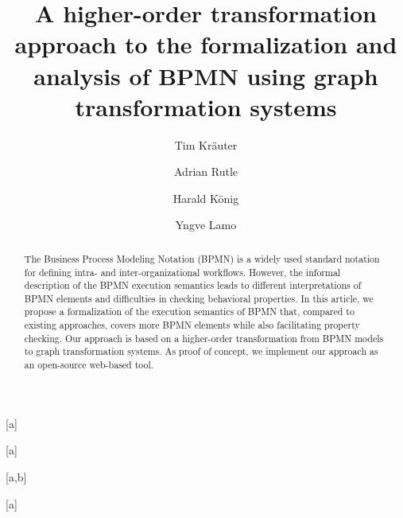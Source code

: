 \documentclass{lmcs} %
\begin{document}
\title[Formalization and analysis of BPMN using graph transformation systems]{A higher-order transformation approach to the formalization and analysis of BPMN using graph transformation systems\rsuper*}

\author[T.~Kr\"{a}uter]{Tim Kr\"{a}uter}[a]
\author[A.~Rutle]{Adrian Rutle}[a]
\author[H.~K\"{o}nig]{Harald K\"{o}nig}[a,b]
\author[Y.~Lamo]{Yngve Lamo}[a]

\address{Western Norway University of Applied Sciences, Bergen, Norway}

\address{University of Applied Sciences, FHDW, Hanover, Germany}

\begin{abstract}
  \noindent
The Business Process Modeling Notation (BPMN) is a widely used standard notation for defining intra- and inter-organizational workflows.
However, the informal description of the BPMN execution semantics leads to different interpretations of BPMN elements and difficulties in checking behavioral properties.
In this article, we propose a formalization of the execution semantics of BPMN that, compared to existing approaches, covers more BPMN elements while also facilitating property checking.
Our approach is based on a higher-order transformation from BPMN models to graph transformation systems.
As proof of concept, we implement our approach as an open-source web-based tool. 
\end{abstract}

\maketitle
\end{document}
